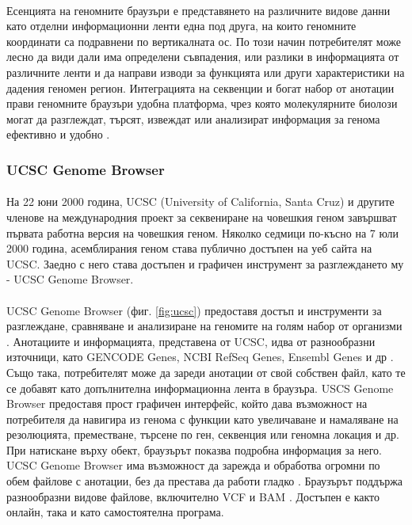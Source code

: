 \documentclass[pdftex,cyrillic,14pt,a4page,twoside,openright]{extreport}
\begin{document}
\paragraph{}
Есенцията на геномните браузъри е представянето на различните видове данни като отделни информационни ленти една под друга, на които геномните координати са подравнени по вертикалната ос. По този начин потребителят може лесно да види дали има определени съвпадения, или разлики в информацията от различните ленти и да направи изводи за функцията или други характеристики на дадения геномен регион. Интеграцията на секвенции и богат набор от анотации прави геномните браузъри удобна платформа, чрез която молекулярните биолози могат да разглеждат, търсят, извеждат или анализират информация за генома ефективно и удобно \cite{wang2013brief}.

\subsubsection{UCSC Genome Browser}
\paragraph{}
На 22 юни 2000 година, UCSC (University of California, Santa Cruz) и другите членове на международния проект за секвениране на човешкия геном завършват първата работна версия на човешкия геном. Няколко седмици по-късно на 7 юли 2000 година, асемблирания геном става публично достъпен на уеб сайта на UCSC. Заедно с него става достъпен и графичен инструмент за разглеждането му - UCSC Genome Browser.

\paragraph{}
UCSC Genome Browser (фиг. \ref{fig:ucsc}) предоставя достъп и инструменти за разглеждане, сравняване и анализиране на геномите на голям набор от организми \cite{fujita2011}. Анотациите и информацията, представена от UCSC, идва от разнообразни източници, като GENCODE Genes, NCBI RefSeq Genes, Ensembl Genes и др \cite{navarro2021}. Също така, потребителят може да зареди анотации от свой собствен файл, като те се добавят като допълнителна информационна лента в браузъра. USCS Genome Browser предоставя прост графичен интерфейс, който дава възможност на потребителя да навигира из генома с функции като увеличаване и намаляване на резолюцията, преместване, търсене по ген, секвенция или геномна локация и др. При натискане върху обект, браузърът показва подробна информация за него. UCSC Genome Browser има възможност да зарежда и обработва огромни по обем файлове с анотации, без да престава да работи гладко \cite{kent2002human}. Браузърът поддържа разнообразни видове файлове, включително VCF \cite{navarro2021} и BAM \cite{fujita2011}. Достъпен е както онлайн, така и като самостоятелна програма.
\end{document}
